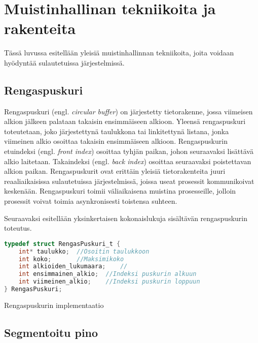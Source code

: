 \chapter{Muistinhallinan tekniikoita ja rakenteita} \label{Neljäs luku}

Tässä luvussa esitellään yleisiä muistinhallinnan tekniikoita, joita voidaan hyödyntää sulautetuissa järjestelmissä.

\section{Rengaspuskuri}

Rengaspuskuri (engl. \textit{circular buffer}) on järjestetty tietorakenne, jossa viimeisen alkion jälkeen palataan takaisin ensimmäiseen alkioon. Yleensä rengaspuskuri toteutetaan, joko järjestettynä taulukkona tai linkitettynä listana, jonka viimeinen alkio osoittaa takaisin ensimmäiseen alkioon. Rengaspuskurin etuindeksi (engl. \textit{front index}) osoittaa tyhjän paikan, johon seuraavaksi lisättävä alkio laitetaan. Takaindeksi (engl. \textit{back index}) osoittaa seuraavaksi poistettavan alkion paikan. Rengaspuskurit ovat erittäin yleisiä tietorakenteita juuri reaaliaikaisissa sulautetuissa järjestelmissä, joissa useat prosessit kommunikoivat keskenään. Rengaspuskuri toimii väliaikaisena muistina prosesseille, jolloin prosessit voivat toimia asynkronisesti toistensa suhteen.\cite{c2015book}

Seuraavaksi esitellään yksinkertaisen kokonaislukuja sisältävän rengaspuskurin toteutus.

\begin{algorithm}[tbh]
\begin{lstlisting}[language=C]
typedef struct RengasPuskuri_t {
    int* taulukko;  //Osoitin taulukkoon
    int koko;       //Maksimikoko
    int alkioiden_lukumaara;    //
    int ensimmainen_alkio;  //Indeksi puskurin alkuun
    int viimeinen_alkio;    //Indeksi puskurin loppuun
} RengasPuskuri;
\end{lstlisting}
\caption{Rengaspuskurin implementaatio\label{alg:Rengaspuskuri}}
\end{algorithm}

\section{Segmentoitu pino}

